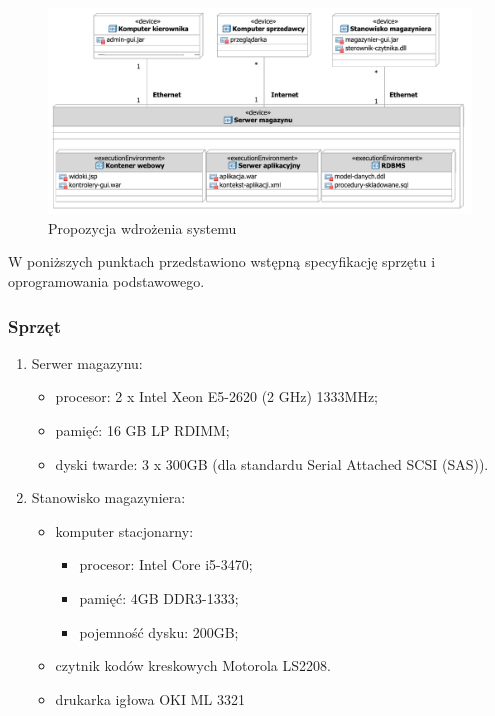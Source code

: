 \begin{figure}[p]
  \begin{center}
    \includegraphics[scale=0.7]{../img/sys/DiagramWdrozenia.pdf}
  \end{center}
  \caption{Propozycja wdrożenia systemu}
  \label{fig:DiagramWdrozenia}
\end{figure}
\FloatBarrier

W poniższych punktach przedstawiono wstępną specyfikację sprzętu i
oprogramowania podstawowego.

\subsubsection{Sprzęt}

\begin{enumerate}
\item Serwer magazynu:
  \begin{itemize}
  \item procesor: 2 x Intel Xeon E5-2620 (2 GHz) 1333MHz;
  \item pamięć: 16 GB LP RDIMM;
  \item dyski twarde: 3 x 300GB (dla standardu Serial Attached SCSI
    (SAS)).
  \end{itemize}
\item Stanowisko magazyniera:
  \begin{itemize}
  \item komputer stacjonarny:
    \begin{itemize}
    \item procesor: Intel Core i5-3470;
    \item pamięć: 4GB DDR3-1333;
    \item pojemność dysku: 200GB;
    \end{itemize}
  \item czytnik kodów kreskowych Motorola LS2208.
  \item drukarka igłowa OKI ML 3321
  \end{itemize}
\end{enumerate}

